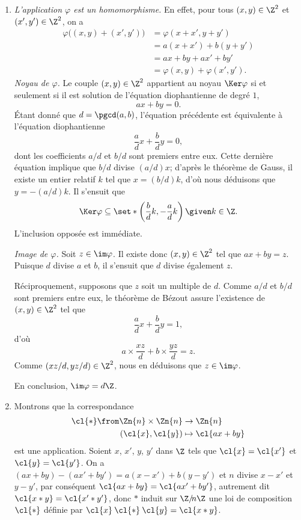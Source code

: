 \begin{enumerate}
  \item %
    \emph{L'application $\varphi$ est un homomorphisme.}
    En effet, pour tous $(x,y)\in\Z^2$ et $(x',y')\in\Z^2$, on a
    \begin{align*}
      \varphi \bigl((x,y)+(x',y')\bigr)
      &= \varphi(x+x',y+y')  \\
      &= a(x+x')+b(y+y') \\
      &= ax + by + ax' + by' \\
      &= \varphi(x,y) + \varphi(x',y').
    \end{align*}
    \emph{Noyau de $\varphi$.}
    Le couple $(x,y)\in\Z^2$ appartient au noyau $\Ker \varphi$ si et seulement si il est solution de l'équation diophantienne de degré $1$,
    \[
      ax + by = 0.
    \]
    Étant donné que $d = \pgcd(a,b)$, l'équation précédente est équivalente à l'équation diophantienne
    \[
      \frac{a}{d}x + \frac{b}{d}y = 0,
    \]
    dont les coefficients $a/d$ et $b/d$ sont premiers entre eux.
    Cette dernière équation implique que $b/d$ divise $(a/d)x$; d'après le théorème de Gauss, il existe un entier relatif $k$ tel que $x = (b/d) k$, d'où nous déduisons que $y = -(a/d)k$.
    Il s'ensuit que
    \[
      \Ker \varphi \subseteq \set*{\left(\frac{b}{d}k, -\frac{a}{d}k\right) \given k\in\Z}.
    \]
    L'inclusion opposée est immédiate.

    \emph{Image de $\varphi$.}
    Soit $z\in\im\varphi$.
    Il existe donc $(x,y)\in\Z^2$ tel que $ax + by = z$.
    Puisque $d$ divise $a$ et $b$, il s'ensuit que $d$ divise également $z$.

    Réciproquement, supposons que $z$ soit un multiple de $d$.
    Comme $a/d$ et $b/d$ sont premiers entre eux, le théorème de Bézout assure l'existence de $(x,y)\in\Z^2$ tel que
    \[
      \frac{a}{d} x + \frac{b}{d} y = 1,
    \]
    d'où
    \[
      a\times  \frac{xz}{d} + b\times \frac{yz}{d} = z.
    \]
    Comme $(xz/d,yz/d)\in\Z^2$, nous en déduisons que $z\in\im\varphi$.

    En conclusion, $\im\varphi = d\Z$.

  \item %
    Montrons que la correspondance
    \begin{align*}
      \mathbin{\cl{*}}\from \Zn{n}\times\Zn{n} & \to\Zn{n} \\
                     (\cl{x},\cl{y}) &\mapsto \cl{ax + by}
    \end{align*}
    est une application.
    Soient $x$, $x'$, $y$, $y'$ dans $\Z$ tels que $\cl{x} = \cl{x'}$ et $\cl{y} = \cl{y'}$.
    On a $(ax + by) - (ax' + by') = a(x - x') + b(y - y')$ et $n$ divise $x - x'$ et $y - y'$, par conséquent $\cl{ax + by} = \cl{ax' + by'}$, autrement dit $\cl{x * y} = \cl{x' * y'}$, donc $*$ induit sur $\Z/\!n\Z$ une loi de composition $\mathbin{\cl{*}}$ définie par $\cl{x}\mathbin{\cl{*}}\cl{y} = \cl{x*y}$.


\end{enumerate}
